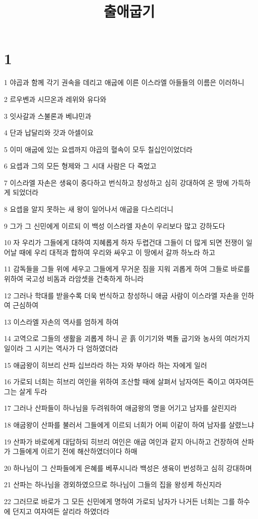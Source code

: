 

\title{출애굽기}


\chapter{1}

\par 1 야곱과 함께 각기 권속을 데리고 애굽에 이른 이스라엘 아들들의 이름은 이러하니
\par 2 르우벤과 시므온과 레위와 유다와
\par 3 잇사갈과 스불론과 베냐민과
\par 4 단과 납달리와 갓과 아셀이요
\par 5 이미 애굽에 있는 요셉까지 야곱의 혈속이 모두 칠십인이었더라
\par 6 요셉과 그의 모든 형제와 그 시대 사람은 다 죽었고
\par 7 이스라엘 자손은 생육이 중다하고 번식하고 창성하고 심히 강대하여 온 땅에 가득하게 되었더라
\par 8 요셉을 알지 못하는 새 왕이 일어나서 애굽을 다스리더니
\par 9 그가 그 신민에게 이르되 이 백성 이스라엘 자손이 우리보다 많고 강하도다
\par 10 자 우리가 그들에게 대하여 지혜롭게 하자 두렵건대 그들이 더 많게 되면 전쟁이 일어날 때에 우리 대적과 합하여 우리와 싸우고 이 땅에서 갈까 하노라 하고
\par 11 감독들을 그들 위에 세우고 그들에게 무거운 짐을 지워 괴롭게 하여 그들로 바로를 위하여 국고성 비돔과 라암셋을 건축하게 하니라
\par 12 그러나 학대를 받을수록 더욱 번식하고 창성하니 애굽 사람이 이스라엘 자손을 인하여 근심하여
\par 13 이스라엘 자손의 역사를 엄하게 하여
\par 14 고역으로 그들의 생활을 괴롭게 하니 곧 흙 이기기와 벽돌 굽기와 농사의 여러가지 일이라 그 시키는 역사가 다 엄하였더라
\par 15 애굽왕이 히브리 산파 십브라라 하는 자와 부아라 하는 자에게 일러
\par 16 가로되 너희는 히브리 여인을 위하여 조산할 때에 살펴서 남자여든 죽이고 여자여든 그는 살게 두라
\par 17 그러나 산파들이 하나님을 두려워하여 애굽왕의 명을 어기고 남자를 살린지라
\par 18 애굽왕이 산파를 불러서 그들에게 이르되 너희가 어찌 이같이 하여 남자를 살렸느냐
\par 19 산파가 바로에게 대답하되 히브리 여인은 애굽 여인과 같지 아니하고 건장하여 산파가 그들에게 이르기 전에 해산하였더이다 하매
\par 20 하나님이 그 산파들에게 은혜를 베푸시니라 백성은 생육이 번성하고 심히 강대하며
\par 21 산파는 하나님을 경외하였으므로 하나님이 그들의 집을 왕성케 하신지라
\par 22 그러므로 바로가 그 모든 신민에게 명하여 가로되 남자가 나거든 너희는 그를 하수에 던지고 여자여든 살리라 하였더라

